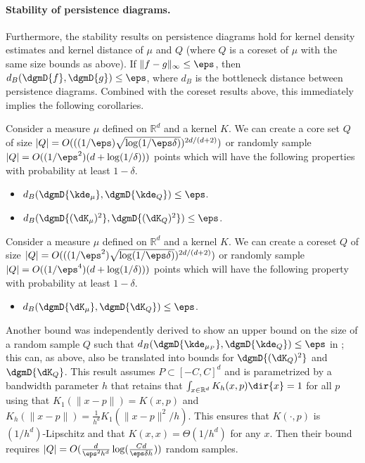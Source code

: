 \documentclass[11pt]{myclass}
\begin{document}
\paragraph{Stability of persistence diagrams.}
Furthermore, the stability results on persistence diagrams \cite{Cohen-SteinerEdelsbrunnerHarer2007} hold for kernel density estimates and kernel distance of $\mu$ and $Q$ (where $Q$ is a coreset of $\mu$ with the same size bounds as above).  If $\|f - g\|_\infty \leq \eps$, then $d_B(\dgmD{f}, \dgmD{g}) \leq \eps$, where $d_B$ is the bottleneck distance between persistence diagrams.  Combined with the coreset results above, this immediately implies the following corollaries.  

\begin{corollary}
Consider a measure $\mu$ defined on $\mathbb{R}^d$ and a kernel $K$.  
We can create a core set $Q$ of size $|Q| = O(((1/\eps) \sqrt{\log (1/\eps \delta)})^{2d/(d+2)})$ or randomly sample $|Q| = O((1/\eps^2)(d + \log(1/\delta)))$ points which will have the following properties with probability at least $1-\delta$.  
\begin{itemize}
\item $d_B(\dgmD{\kde_\mu}, \dgmD{\kde_Q}) \leq \eps$.
\item $d_B(\dgmD{(\dK_\mu)^2}, \dgmD{(\dK_Q)^2}) \leq \eps$.
\end{itemize}
\end{corollary}


\begin{corollary}
Consider a measure $\mu$ defined on $\mathbb{R}^d$ and a kernel $K$.  
We can create a coreset $Q$ of size $|Q| = O(((1/\eps^2) \sqrt{\log (1/\eps \delta)})^{2d/(d+2)})$ or randomly sample $|Q| = O((1/\eps^4)(d + \log(1/\delta)))$ points which will have the following property with probability at least $1-\delta$.  
\begin{itemize}
\item $d_B(\dgmD{\dK_\mu}, \dgmD{\dK_Q}) \leq \eps$.
\end{itemize}
\end{corollary}



Another bound was independently derived to show an upper bound on the size of a random sample $Q$ such that $d_B(\dgmD{\kde_{\mu_P}}, \dgmD{\kde_Q}) \leq \eps$ in \cite{BFLRSW13};  this can, as above, also be translated into bounds for $\dgmD{(\dK_Q)^2}$ and $\dgmD{\dK_Q}$.  This result assumes $P \subset [-C,C]^d$ and is parametrized by a bandwidth parameter $h$ that retains that $\int_{x \in \mathbb{R}^d} K_h(x,p) \dir{x} = 1$ for all $p$ using that $K_1(\|x-p\|) =K(x,p)$ and $K_h(\|x-p\|) = \frac{1}{h^d} K_1(\|x-p\|^2/h)$.  This ensures that $K(\cdot, p)$ is $(1/h^d)$-Lipschitz and that $K(x,x) = \Theta(1/h^d)$ for any $x$.  Then their bound requires
$|Q| = O(\frac{d}{\eps^2 h^d} \log(\frac{C d }{\eps \delta h}))$ random samples.  
\end{document}
